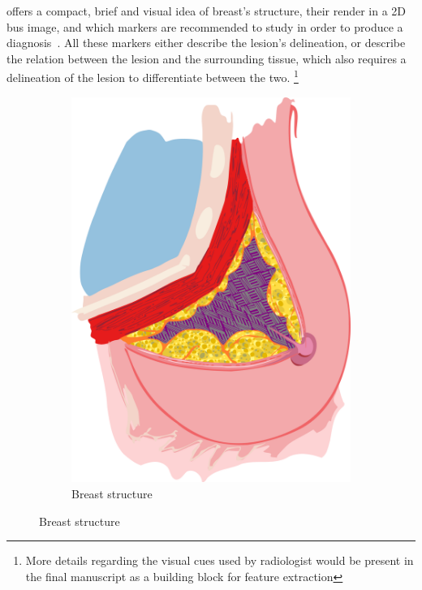  offers a compact, brief and visual idea of breast's structure, their render in a 2D \ac{bus} image, and which markers are recommended to study in order to produce a diagnosis~\cite{biradsus}.
All these markers either describe the lesion's delineation, or describe the relation between the lesion and the surrounding tissue, which also requires a delineation of the lesion to differentiate between the two.
\footnote{More details regarding the visual cues used by radiologist would be present in the final manuscript as a building block for feature extraction}


\begin{figure}
    \centering
    \begin{subfigure}[b]{0.28\textwidth}
        \centering
        \includegraphics[width=\textwidth]{breast}
        \caption{{\small Breast structure}}    
        \label{fig:lesions:breast}
    \end{subfigure}

\end{figure}
